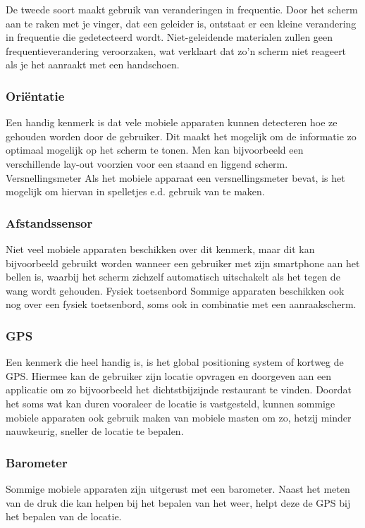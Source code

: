 De tweede soort maakt gebruik van veranderingen in frequentie. Door het scherm aan te raken met je vinger, dat een geleider is, ontstaat er een kleine verandering in frequentie die gedetecteerd wordt. Niet-geleidende materialen zullen geen frequentieverandering veroorzaken, wat verklaart dat zo'n scherm niet reageert als je het aanraakt met een handschoen.

\subsubsection{Oriëntatie}
Een handig kenmerk is dat vele mobiele apparaten kunnen detecteren hoe ze gehouden worden door de gebruiker. Dit maakt het mogelijk om de informatie zo optimaal mogelijk op het scherm te tonen. Men kan bijvoorbeeld een verschillende lay-out voorzien voor een staand en liggend scherm.
Versnellingsmeter
Als het mobiele apparaat een versnellingsmeter bevat, is het mogelijk om hiervan in spelletjes e.d. gebruik van te maken.

\subsubsection{Afstandssensor}
Niet veel mobiele apparaten beschikken over dit kenmerk, maar dit kan bijvoorbeeld gebruikt worden wanneer een gebruiker met zijn smartphone aan het bellen is, waarbij het scherm zichzelf automatisch uitschakelt als het tegen de wang wordt gehouden.
Fysiek toetsenbord
Sommige apparaten beschikken ook nog over een fysiek toetsenbord, soms ook in combinatie met een aanraakscherm. 

\subsubsection{GPS}
Een kenmerk die heel handig is, is het global positioning system of kortweg de GPS. Hiermee kan de gebruiker zijn locatie opvragen en doorgeven aan een applicatie om zo bijvoorbeeld het dichtstbijzijnde restaurant te vinden. Doordat het soms wat kan duren vooraleer de locatie is vastgesteld, kunnen sommige mobiele apparaten ook gebruik maken van mobiele masten om zo, hetzij minder nauwkeurig, sneller de locatie te bepalen.

\subsubsection{Barometer}
Sommige mobiele apparaten zijn uitgerust met een barometer. Naast het meten van de druk die kan helpen bij het bepalen van het weer, helpt deze de GPS bij het bepalen van de locatie.


